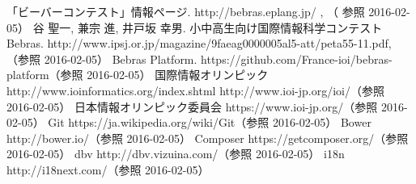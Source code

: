 \documentclass[a4paper]{jarticle}
\begin{document}
\begin{thebibliography}{1}

 「ビーバーコンテスト」情報ページ.  http://bebras.eplang.jp/ , （
参照 2016-02-05）
 谷 聖一, 兼宗 進, 井戸坂 幸男. 小中高生向け国際情報科学コンテストBebras.  http://www.ipsj.or.jp/magazine/9faeag0000005al5-att/peta55-11.pdf, （参照 2016-02-05）
 Bebras Platform. https://github.com/France-ioi/bebras-platform（参照 2016-02-05）
 国際情報オリンピック http://www.ioinformatics.org/index.shtml   http://www.ioi-jp.org/ioi/（参照 2016-02-05）
日本情報オリンピック委員会 https://www.ioi-jp.org/（参照 2016-02-05）
 Git  https://ja.wikipedia.org/wiki/Git（参照 2016-02-05）
Bower  http://bower.io/（参照 2016-02-05）
Composer  https://getcomposer.org/（参照 2016-02-05）
dbv  http://dbv.vizuina.com/（参照 2016-02-05）
i18n  http://i18next.com/（参照 2016-02-05）



\end{thebibliography}
\end{document}
